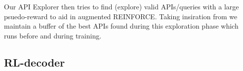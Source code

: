 Our API Explorer then tries to find (explore) valid APIs/queries with a large psuedo-reward to aid in augmented REINFORCE. Taking insiration from \cite{NIPS2018_8204} we maintain a buffer of the best APIs found during this exploration phase which runs before and during training.

\subsection{RL-decoder}
\label{ssec:rldecode}

